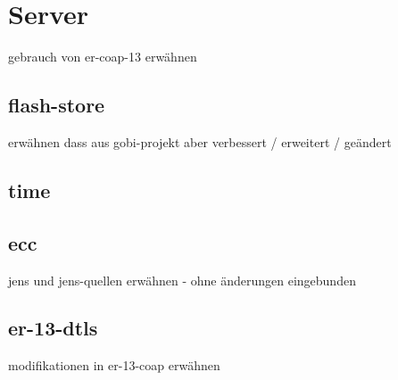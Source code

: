 \section{Server}
gebrauch von er-coap-13 erwähnen

\subsection{flash-store}
erwähnen dass aus gobi-projekt aber verbessert / erweitert / geändert

\subsection{time}

\subsection{ecc}
jens und jens-quellen erwähnen - ohne änderungen eingebunden

\subsection{er-13-dtls}
modifikationen in er-13-coap erwähnen